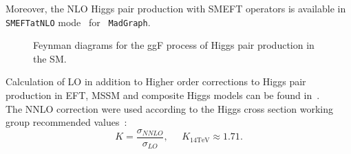 %
Moreover, the NLO Higgs pair production with SMEFT operators is available in \texttt{SMEFTatNLO} mode~\cite{Degrande:2020evl} for ~\texttt{MadGraph}.
\begin{figure}[!htpb]
	\centering
	\caption{Feynman diagrams for the ggF process of Higgs pair production in the SM.} 
	\label{dihiggs-gridplot}
\end{figure}
%
Calculation of LO in addition to Higher order corrections to Higgs pair production in EFT, MSSM and composite Higgs models can be found in~\cite{Grober:2010yv,Grober:2015cwa,Grober:2017gut,deFlorian:2017qfk,Buchalla:2018yce}.\\ 
The NNLO correction were used according to the Higgs cross section working group recommended values~\cite{Dittmaier:2012vm,deFlorian:2016spz}:
\begin{equation}
	K = \frac{\sigma_{NNLO}}{\sigma_{LO}}, \;\;\;\;\; K_{14 \mathrm{TeV}} \approx 1.71.
\end{equation}
